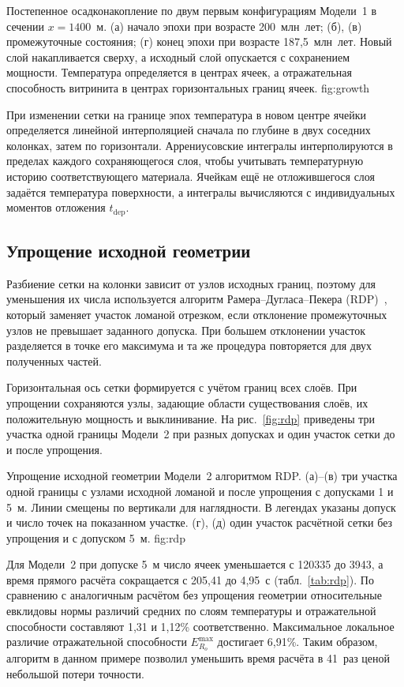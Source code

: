 {Постепенное осадконакопление по двум первым конфигурациям Модели~1 в сечении $x=1400$~м. (а) начало эпохи при возрасте 200~млн~лет; (б), (в) промежуточные состояния; (г) конец эпохи при возрасте 187,5~млн~лет. Новый слой накапливается сверху, а исходный слой опускается с сохранением мощности. Температура определяется в центрах ячеек, а отражательная способность витринита в центрах горизонтальных границ ячеек.} {fig:growth}

При изменении сетки на границе эпох температура в новом центре ячейки определяется линейной интерполяцией сначала по глубине в двух соседних колонках, затем по горизонтали. Аррениусовские интегралы интерполируются в пределах каждого сохраняющегося слоя, чтобы учитывать температурную историю соответствующего материала. Ячейкам ещё не отложившегося слоя задаётся температура поверхности, а интегралы вычисляются с индивидуальных моментов отложения $t_{\mathrm{dep}}$.

\subsection{Упрощение исходной геометрии}

Разбиение сетки на колонки зависит от узлов исходных границ, поэтому для уменьшения их числа используется алгоритм Рамера--Дугласа--Пекера (RDP)~\cite{ramer1972,douglas1973}, который заменяет участок ломаной отрезком, если отклонение промежуточных узлов не превышает заданного допуска. При большем отклонении участок разделяется в точке его максимума и та же процедура повторяется для двух полученных частей.

Горизонтальная ось сетки формируется с учётом границ всех слоёв. При упрощении сохраняются узлы, задающие области существования слоёв, их положительную мощность и выклинивание. На рис.~\ref{fig:rdp} приведены три участка одной границы Модели~2 при разных допусках и один участок сетки до и после упрощения.

 {Упрощение исходной геометрии Модели~2 алгоритмом RDP. (а)--(в) три участка одной границы с узлами исходной ломаной и после упрощения с допусками 1 и 5~м. Линии смещены по вертикали для наглядности. В легендах указаны допуск и число точек на показанном участке. (г), (д) один участок расчётной сетки без упрощения и с допуском 5~м.} {fig:rdp}

Для Модели~2 при допуске 5~м число ячеек уменьшается с 120335 до 3943, а время прямого расчёта сокращается с 205,41 до 4,95~с (табл.~\ref{tab:rdp}). По сравнению с аналогичным расчётом без упрощения геометрии относительные евклидовы нормы различий средних по слоям температуры и отражательной способности составляют 1,31 и 1,12\% соответственно. Максимальное локальное различие отражательной способности $E_{R_o}^{\max}$ достигает 6,91\%. Таким образом, алгоритм в данном примере позволил уменьшить время расчёта в 41~раз ценой небольшой потери точности.

